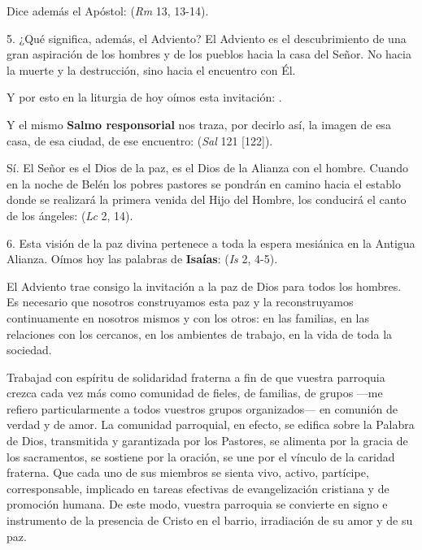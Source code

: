 \begin{body}
	Dice además el Apóstol:  (\emph{Rm} 13, 13-14). 
	
	5. ¿Qué significa, además, el Adviento? El Adviento es el descubrimiento de una gran aspiración de los hombres y de los pueblos hacia la casa del Señor. No hacia la muerte y la destrucción, sino hacia el encuentro con Él. 
	
	Y por esto en la liturgia de hoy oímos esta invitación: . 
	
	Y el mismo \textbf{Salmo responsorial} nos traza, por decirlo así, la imagen de esa casa, de esa ciudad, de ese encuentro:  (\emph{Sal} 121 {[}122{]}). 
	
	Sí. El Señor es el Dios de la paz, es el Dios de la Alianza con el hombre. Cuando en la noche de Belén los pobres pastores se pondrán en camino hacia el establo donde se realizará la primera venida del Hijo del Hombre, los conducirá el canto de los ángeles:  (\emph{Lc} 2, 14). 
	
	6. Esta visión de la paz divina pertenece a toda la espera mesiánica en la Antigua Alianza. Oímos hoy las palabras de \textbf{Isaías}:  (\emph{Is} 2, 4-5). 
	
	El Adviento trae consigo la invitación a la paz de Dios para todos los hombres. Es necesario que nosotros construyamos esta paz y la reconstruyamos continuamente en nosotros mismos y con los otros: en las familias, en las relaciones con los cercanos, en los ambientes de trabajo, en la vida de toda la sociedad. 
	
	Trabajad con espíritu de solidaridad fraterna a fin de que vuestra parroquia crezca cada vez más como comunidad de fieles, de familias, de grupos ---me refiero particularmente a todos vuestros grupos organizados--- en comunión de verdad y de amor. La comunidad parroquial, en efecto, se edifica sobre la Palabra de Dios, transmitida y garantizada por los Pastores, se alimenta por la gracia de los sacramentos, se sostiene por la oración, se une por el vínculo de la caridad fraterna. Que cada uno de sus miembros se sienta vivo, activo, partícipe, corresponsable, implicado en tareas efectivas de evangelización cristiana y de promoción humana. De este modo, vuestra parroquia se convierte en signo e instrumento de la presencia de Cristo en el barrio, irradiación de su amor y de su paz. 
	

\end{body}
